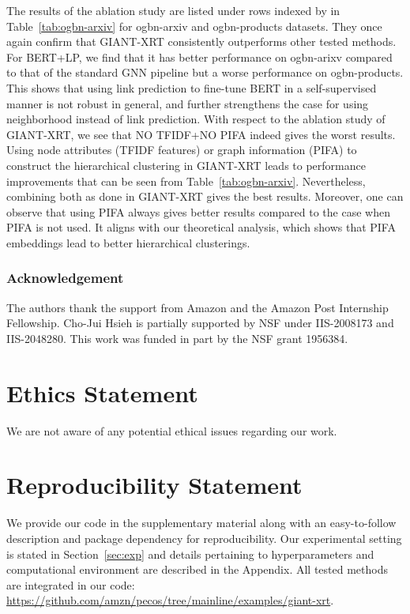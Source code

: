 \documentclass{article} \usepackage{iclr2022_conference,times}
\begin{document}
The results of the ablation study are listed under rows indexed by  in Table~\ref{tab:ogbn-arxiv} for ogbn-arxiv and ogbn-products datasets. They once again confirm that GIANT-XRT consistently outperforms other tested methods. For BERT+LP, we find that it has better performance on ogbn-arixv compared to that of the standard GNN pipeline but a worse performance on ogbn-products. This shows that using link prediction to fine-tune BERT in a self-supervised manner is not robust in general, and further strengthens the case for using neighborhood instead of link prediction. With respect to the ablation study of GIANT-XRT, we see that NO TFIDF+NO PIFA indeed gives the worst results. Using node attributes (TFIDF features) or graph information (PIFA) to construct the hierarchical clustering in GIANT-XRT leads to performance improvements that can be seen from Table~\ref{tab:ogbn-arxiv}. Nevertheless, combining both as done in GIANT-XRT gives the best results. Moreover, one can observe that using PIFA always gives better results compared to the case when PIFA is not used. It aligns with our theoretical analysis, which shows that PIFA embeddings lead to better hierarchical clusterings.







\subsubsection*{Acknowledgement}
The authors thank the support from Amazon and the Amazon Post Internship Fellowship. Cho-Jui Hsieh is partially supported by NSF under IIS-2008173 and IIS-2048280. This work was funded in part by the NSF grant 1956384.

\section{Ethics Statement}
We are not aware of any potential ethical issues regarding our work.
\section{Reproducibility Statement}
We provide our code in the supplementary material along with an easy-to-follow description and package dependency for reproducibility. Our experimental setting is stated in Section~\ref{sec:exp} and details pertaining to hyperparameters and computational environment are described in the Appendix. All tested methods are integrated in our code:
\url{https://github.com/amzn/pecos/tree/mainline/examples/giant-xrt}.
\end{document}
